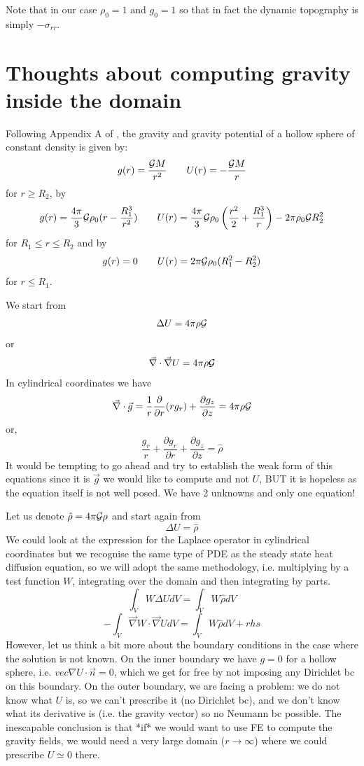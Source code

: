 Note that in our case $\rho_0=1$ and $g_0=1$ so that in fact the dynamic topography 
is simply $-\sigma_{rr}$.

\newpage
\section*{Thoughts about computing gravity inside the domain}

Following Appendix A of \textcite{thie18}, the gravity and
gravity potential of a hollow sphere of constant 
density is given by:
\[
g(r)=\frac{{\cal G}M}{r^2}
\qquad
U(r)=-\frac{{\cal G}M}{r}
\]
for $r\ge R_2$, by 
\[
g(r)=\frac{4 \pi}{3} {\cal G} \rho_0 (r-\frac{R_1^3}{r^2})
\qquad
U(r)=\frac{4\pi}{3}{\cal G} \rho_0 \left( \frac{r^2}{2}+ \frac{R_1^3}{r} \right)
-2 \pi \rho_0 {\cal G}R_2^2
\]
for $R_1\le r \le R_2$ and by 
\[
g(r)=0
\qquad
U(r)=2\pi {\cal G} \rho_0 (R_1^2-R_2^2)
\]
for $r\le R_1$.


We start from 
\[
\Delta U = 4 \pi \rho {\cal G}
\]
or 
\[
\vec\nabla \cdot \vec\nabla  U = 4 \pi \rho {\cal G}
\]
In cylindrical coordinates we have
\[
\vec\nabla\cdot \vec{g} 
= \frac{1}{r} \frac{\partial }{\partial r} (r g_r) 
+\frac{\partial g_z}{\partial z}  = 4\pi \rho {\cal G}
\]
or, 
\[
\frac{g_r}{r} + \frac{\partial g_r}{\partial r} 
+\frac{\partial g_z}{\partial z}  = \hat{\rho}
\]
It would be tempting to go ahead and try to establish the 
weak form of this equations since it is $\vec{g}$ we would 
like to compute and not $U$, BUT it is hopeless as the equation 
itself is not well posed. We have 2 unknowns and only one equation!

Let us denote $\hat{\rho}=4\pi {\cal G} \rho$ and start again from 
\[
\Delta U = \hat{\rho}
\]
We could look at the expression for the Laplace operator
in cylindrical coordinates but we recognise the same type of 
PDE as the steady state heat diffusion equation, so we
will adopt the same methodology, i.e. multiplying by a test function
$W$, integrating over the domain and then integrating by parts.
\[
\int_V W \Delta U dV = \int_V W \hat{\rho} dV
\]
\[
- \int_V \vec\nabla W \cdot \vec\nabla U dV = \int_V W \hat{\rho} dV + rhs
\]
However, let us think a bit more about the boundary conditions in the 
case where the solution is not known. 
On the inner boundary we have $g=0$ for a hollow sphere, 
i.e. $vec\nabla U\cdot \vec{n}=0$, 
which we get for free by not imposing any Dirichlet bc on this boundary.
On the outer boundary, we are facing a problem: we do not know what $U$
is, so we can't prescribe it (no Dirichlet bc), and we don't know 
what its derivative is (i.e. the gravity vector) so no Neumann bc possible.
The inescapable conclusion is that *if* we would want to 
use FE to compute the gravity fields, we would need a very large domain 
($r\rightarrow \infty$) where we could prescribe $U\simeq 0$ there.




